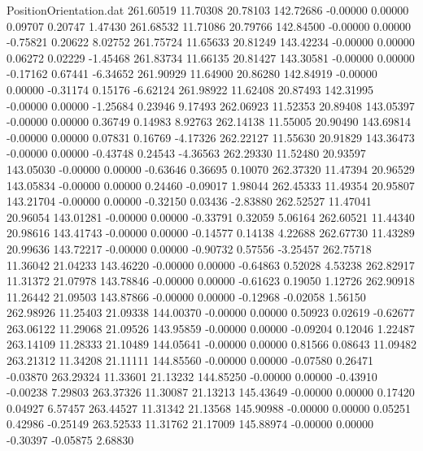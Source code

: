 \begin{filecontents}{PositionOrientation.dat}
 261.60519   11.70308   20.78103   142.72686   -0.00000    0.00000    0.09707    0.20747    1.47430
 261.68532   11.71086   20.79766   142.84500   -0.00000    0.00000   -0.75821    0.20622    8.02752
 261.75724   11.65633   20.81249   143.42234   -0.00000    0.00000    0.06272    0.02229   -1.45468
 261.83734   11.66135   20.81427   143.30581   -0.00000    0.00000   -0.17162    0.67441   -6.34652
 261.90929   11.64900   20.86280   142.84919   -0.00000    0.00000   -0.31174    0.15176   -6.62124
 261.98922   11.62408   20.87493   142.31995   -0.00000    0.00000   -1.25684    0.23946    9.17493
 262.06923   11.52353   20.89408   143.05397   -0.00000    0.00000    0.36749    0.14983    8.92763
 262.14138   11.55005   20.90490   143.69814   -0.00000    0.00000    0.07831    0.16769   -4.17326
 262.22127   11.55630   20.91829   143.36473   -0.00000    0.00000   -0.43748    0.24543   -4.36563
 262.29330   11.52480   20.93597   143.05030   -0.00000    0.00000   -0.63646    0.36695    0.10070
 262.37320   11.47394   20.96529   143.05834   -0.00000    0.00000    0.24460   -0.09017    1.98044
 262.45333   11.49354   20.95807   143.21704   -0.00000    0.00000   -0.32150    0.03436   -2.83880
 262.52527   11.47041   20.96054   143.01281   -0.00000    0.00000   -0.33791    0.32059    5.06164
 262.60521   11.44340   20.98616   143.41743   -0.00000    0.00000   -0.14577    0.14138    4.22688
 262.67730   11.43289   20.99636   143.72217   -0.00000    0.00000   -0.90732    0.57556   -3.25457
 262.75718   11.36042   21.04233   143.46220   -0.00000    0.00000   -0.64863    0.52028    4.53238
 262.82917   11.31372   21.07978   143.78846   -0.00000    0.00000   -0.61623    0.19050    1.12726
 262.90918   11.26442   21.09503   143.87866   -0.00000    0.00000   -0.12968   -0.02058    1.56150
 262.98926   11.25403   21.09338   144.00370   -0.00000    0.00000    0.50923    0.02619   -0.62677
 263.06122   11.29068   21.09526   143.95859   -0.00000    0.00000   -0.09204    0.12046    1.22487
 263.14109   11.28333   21.10489   144.05641   -0.00000    0.00000    0.81566    0.08643   11.09482
 263.21312   11.34208   21.11111   144.85560   -0.00000    0.00000   -0.07580    0.26471   -0.03870
 263.29324   11.33601   21.13232   144.85250   -0.00000    0.00000   -0.43910   -0.00238    7.29803
 263.37326   11.30087   21.13213   145.43649   -0.00000    0.00000    0.17420    0.04927    6.57457
 263.44527   11.31342   21.13568   145.90988   -0.00000    0.00000    0.05251    0.42986   -0.25149
 263.52533   11.31762   21.17009   145.88974   -0.00000    0.00000   -0.30397   -0.05875    2.68830

\end{filecontents}
